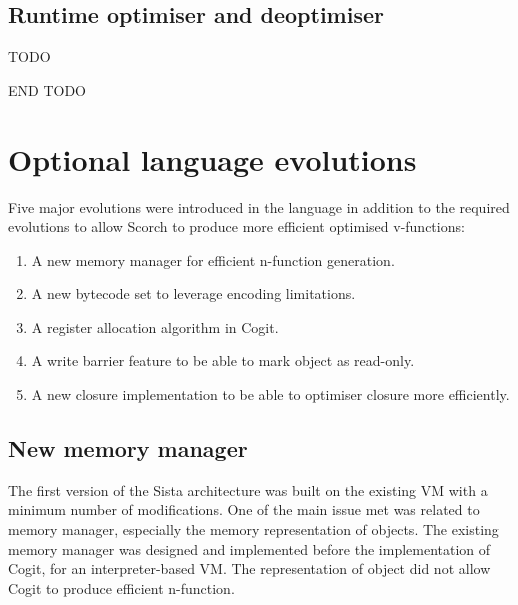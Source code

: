 \documentclass[a4paper,12pt,twoside]{../includes/ThesisStyle}
\begin{document}
\subsection{Runtime optimiser and deoptimiser}

TODO




END TODO


\section{Optional language evolutions}


Five major evolutions were introduced in the language in addition to the required evolutions to allow Scorch to produce more efficient optimised v-functions:
\begin{enumerate}
	\item A new memory manager for efficient n-function generation.
	\item A new bytecode set to leverage encoding limitations.
	\item A register allocation algorithm in Cogit.
	\item A write barrier feature to be able to mark object as read-only.
	\item A new closure implementation to be able to optimiser closure more efficiently.
\end{enumerate}

\subsection{New memory manager}

The first version of the Sista architecture was built on the existing VM with a minimum number of modifications. One of the main issue met was related to memory manager, especially the memory representation of objects. The existing memory manager was designed and implemented before the implementation of Cogit, for an interpreter-based VM. The representation of object did not allow Cogit to produce efficient n-function.
\end{document}
